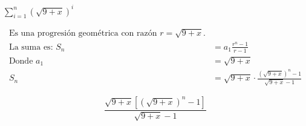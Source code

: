 $\displaystyle \sum_{i=1}^{n} \left(\sqrt{9+x}\right)^i$

\nopagebreak
\begin{align*}
\text{Es una progresión geométrica con razón } r = \sqrt{9+x}. \\
\text{La suma es: } S_n &= a_1 \frac{r^n - 1}{r - 1} \\
\text{Donde } a_1 &= \sqrt{9+x} \\
S_n &= \sqrt{9+x} \cdot \frac{(\sqrt{9+x})^n - 1}{\sqrt{9+x} - 1}
\end{align*}

\[
\boxed{\displaystyle \frac{\sqrt{9+x}\left[(\sqrt{9+x})^n - 1\right]}{\sqrt{9+x} - 1}}
\]
